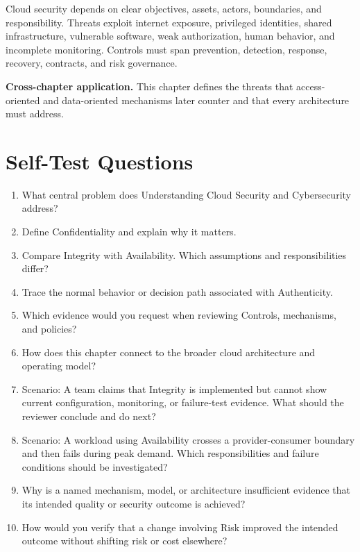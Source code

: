 \documentclass[11pt]{article}
\begin{document}
\begin{synthesisbox}
Cloud security depends on clear objectives, assets, actors, boundaries, and responsibility. Threats exploit internet exposure, privileged identities, shared infrastructure, vulnerable software, weak authorization, human behavior, and incomplete monitoring. Controls must span prevention, detection, response, recovery, contracts, and risk governance.
\par\smallskip
\textbf{Cross-chapter application.} This chapter defines the threats that access-oriented and data-oriented mechanisms later counter and that every architecture must address.
\end{synthesisbox}
\section{Self-Test Questions}
\begin{enumerate}
\item What central problem does Understanding Cloud Security and Cybersecurity address?
\item Define Confidentiality and explain why it matters.
\item Compare Integrity with Availability. Which assumptions and responsibilities differ?
\item Trace the normal behavior or decision path associated with Authenticity.
\item Which evidence would you request when reviewing Controls, mechanisms, and policies?
\item How does this chapter connect to the broader cloud architecture and operating model?
\item Scenario: A team claims that Integrity is implemented but cannot show current configuration, monitoring, or failure-test evidence. What should the reviewer conclude and do next?
\item Scenario: A workload using Availability crosses a provider-consumer boundary and then fails during peak demand. Which responsibilities and failure conditions should be investigated?
\item Why is a named mechanism, model, or architecture insufficient evidence that its intended quality or security outcome is achieved?
\item How would you verify that a change involving Risk improved the intended outcome without shifting risk or cost elsewhere?
\end{enumerate}
\clearpage
\end{document}
